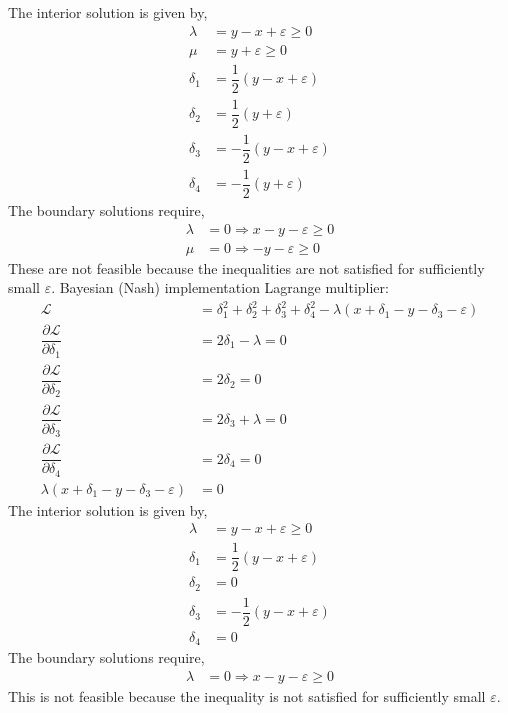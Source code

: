 \documentclass{article}
\begin{document}
The interior solution is given by,
\begin{align*}
\lambda &= y - x + \varepsilon \geq  0
\\ \mu &= y + \varepsilon \geq  0
\\ \delta_{1} &= \dfrac{1}{2} \left(y - x + \varepsilon\right)
\\ \delta_{2} &= \dfrac{1}{2} \left(y + \varepsilon\right)
\\ \delta_{3} &= - \dfrac{1}{2} \left(y - x + \varepsilon\right)
\\ \delta_{4} &= - \dfrac{1}{2} \left(y + \varepsilon\right)
\end{align*}
The boundary solutions require,
\begin{align*}
\lambda &= 0 \Rightarrow  x  - y - \varepsilon \geq  0
\\ \mu &= 0 \Rightarrow  - y  - \varepsilon \geq  0
\end{align*}
These are not feasible because the inequalities are not satisfied for sufficiently small $\varepsilon$.
\newline \newline
Bayesian (Nash) implementation Lagrange multiplier:
\begin{align*}
\mathcal{L} &= \delta_{1}^{2} + \delta_{2}^{2} + \delta_{3}^{2} + \delta_{4}^{2} - \lambda\left(x + \delta_{1} - y - \delta_{3} - \varepsilon\right)
\\ \dfrac{\partial \mathcal{L}}{\partial \delta_{1}} &= 2 \delta_{1} - \lambda = 0
\\ \dfrac{\partial \mathcal{L}}{\partial \delta_{2}} &= 2 \delta_{2} = 0
\\ \dfrac{\partial \mathcal{L}}{\partial \delta_{3}} &= 2 \delta_{3} + \lambda = 0
\\ \dfrac{\partial \mathcal{L}}{\partial \delta_{4}} &= 2 \delta_{4} = 0
\\ \lambda\left(x + \delta_{1} - y - \delta_{3} - \varepsilon\right) &= 0
\end{align*}
The interior solution is given by,
\begin{align*}
\lambda &= y - x + \varepsilon \geq  0
\\ \delta_{1} &= \dfrac{1}{2} \left(y - x + \varepsilon\right)
\\ \delta_{2} &= 0
\\ \delta_{3} &= - \dfrac{1}{2} \left(y - x + \varepsilon\right)
\\ \delta_{4} &= 0
\end{align*}
The boundary solutions require,
\begin{align*}
\lambda &= 0 \Rightarrow  x  - y - \varepsilon  \geq  0
\end{align*}
This is not feasible because the inequality is not satisfied for sufficiently small $\varepsilon$.
\newline \newline
\end{document}
